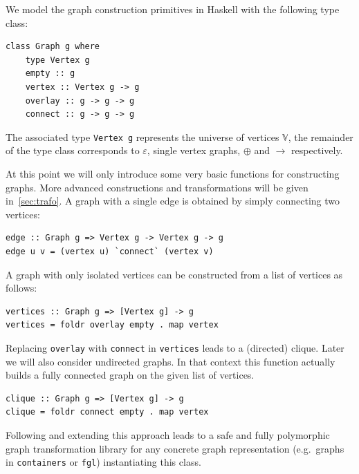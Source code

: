\documentclass{article}
\newcommand{\hs}{\texttt}
\renewcommand{\epsilon}{\varepsilon}
\newcommand{\eps}{\epsilon}
\newcommand{\overlay}{\oplus}
\newcommand{\connect}{\rightarrow}
\begin{document}
We model the graph construction primitives in Haskell with the following type
class:
\begin{verbatim}
class Graph g where
    type Vertex g
    empty :: g
    vertex :: Vertex g -> g
    overlay :: g -> g -> g
    connect :: g -> g -> g
\end{verbatim}
The associated type \hs{Vertex g} represents the universe of vertices
$\mathbb{V}$, the remainder of the type class corresponds to $\eps$, single
vertex graphs, $\overlay$ and $\connect$ respectively.

At this point we will only introduce some very basic functions for constructing
graphs. More advanced constructions and transformations will be given
in~\autoref{sec:trafo}. A graph with a single edge is obtained by simply
connecting two vertices:
\begin{verbatim}
edge :: Graph g => Vertex g -> Vertex g -> g
edge u v = (vertex u) `connect` (vertex v)
\end{verbatim}
A graph with only isolated vertices can be constructed from a list of vertices
as follows:
\begin{verbatim}
vertices :: Graph g => [Vertex g] -> g
vertices = foldr overlay empty . map vertex
\end{verbatim}
Replacing \hs{overlay} with \hs{connect} in \hs{vertices} leads to a (directed)
clique. Later we will also consider undirected graphs. In that context this
function actually builds a fully connected graph on the given list of vertices.
\begin{verbatim}
clique :: Graph g => [Vertex g] -> g
clique = foldr connect empty . map vertex
\end{verbatim}
Following and extending this approach leads to a safe and fully polymorphic
graph transformation library for any concrete graph representation (e.g.\ graphs
in \texttt{containers} or \texttt{fgl}) instantiating this class.
\end{document}
